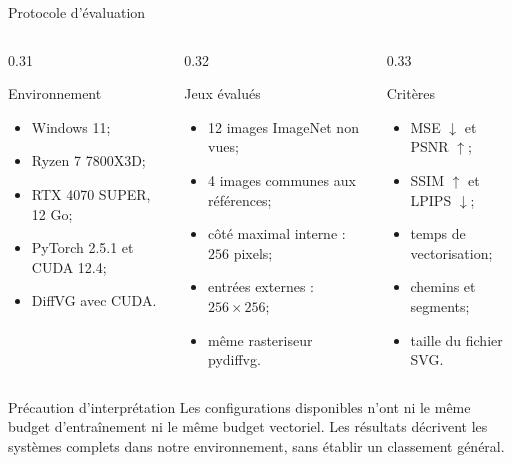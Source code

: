 \documentclass[11pt,aspectratio=169]{beamer}
\begin{document}
\begin{frame}{Protocole d'évaluation}
  \begin{columns}[T,onlytextwidth]
    \begin{column}{0.31\textwidth}
      \begin{block}{Environnement}
        \begin{itemize}\small
          \item Windows 11;
          \item Ryzen 7 7800X3D;
          \item RTX 4070 SUPER, 12 Go;
          \item PyTorch 2.5.1 et CUDA 12.4;
          \item DiffVG avec CUDA.
        \end{itemize}
      \end{block}
    \end{column}
    \begin{column}{0.32\textwidth}
      \begin{block}{Jeux évalués}
        \begin{itemize}\small
          \item 12 images ImageNet non vues;
          \item 4 images communes aux références;
          \item côté maximal interne : $256$ pixels;
          \item entrées externes : $256\times256$;
          \item même rasteriseur pydiffvg.
        \end{itemize}
      \end{block}
    \end{column}
    \begin{column}{0.33\textwidth}
      \begin{block}{Critères}
        \begin{itemize}\small
          \item MSE $\downarrow$ et PSNR $\uparrow$;
          \item SSIM $\uparrow$ et LPIPS $\downarrow$;
          \item temps de vectorisation;
          \item chemins et segments;
          \item taille du fichier SVG.
        \end{itemize}
      \end{block}
    \end{column}
  \end{columns}

  \vspace{0.35cm}
  \begin{alertblock}{Précaution d'interprétation}
    Les configurations disponibles n'ont ni le même budget d'entraînement ni le même budget vectoriel. Les résultats décrivent les systèmes complets dans notre environnement, sans établir un classement général.
  \end{alertblock}
\end{frame}
\end{document}

